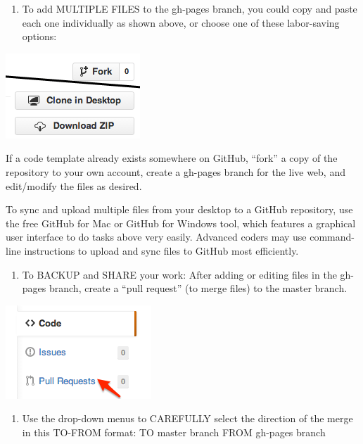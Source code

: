 \documentclass[
  english,
]{book}
\providecommand{\tightlist}{%
  \setlength{\itemsep}{0pt}\setlength{\parskip}{0pt}}
\begin{document}
\begin{enumerate}
\def\labelenumi{\arabic{enumi})}
\setcounter{enumi}{10}
\tightlist
\item
  To add MULTIPLE FILES to the gh-pages branch, you could copy and paste each one individually as shown above, or choose one of these labor-saving options:
\end{enumerate}

\includegraphics{images/08-github/GitHub-ForkCloneDownload.png}

If a code template already exists somewhere on GitHub, ``fork'' a copy of the repository to your own account, create a gh-pages branch for the live web, and edit/modify the files as desired.

To sync and upload multiple files from your desktop to a GitHub repository, use the free GitHub for Mac or GitHub for Windows tool, which features a graphical user interface to do tasks above very easily.
Advanced coders may use command-line instructions to upload and sync files to GitHub most efficiently.

\begin{enumerate}
\def\labelenumi{\arabic{enumi})}
\setcounter{enumi}{11}
\tightlist
\item
  To BACKUP and SHARE your work: After adding or editing files in the gh-pages branch, create a ``pull request'' (to merge files) to the master branch.
\end{enumerate}

\includegraphics{images/08-github/GitHub-PullRequest.png}

\begin{enumerate}
\def\labelenumi{\arabic{enumi})}
\setcounter{enumi}{12}
\tightlist
\item
  Use the drop-down menus to CAREFULLY select the direction of the merge in this TO-FROM format:
  TO master branch FROM gh-pages branch
\end{enumerate}
\end{document}
